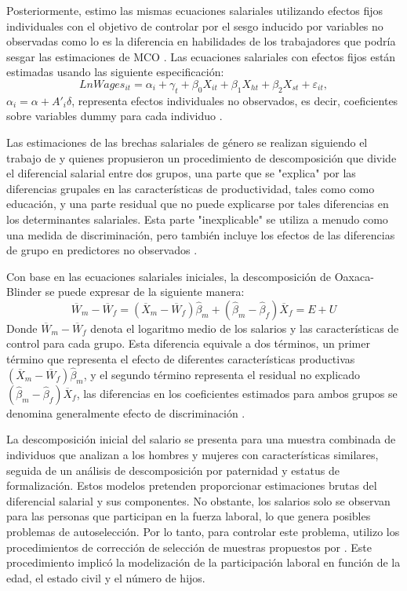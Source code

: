 Posteriormente, estimo las mismas ecuaciones salariales utilizando efectos fijos individuales con el objetivo de controlar por el sesgo inducido por variables no observadas como lo es la diferencia en habilidades de los trabajadores que podría sesgar las estimaciones de MCO \citep{Angrist2008}. Las ecuaciones salariales con efectos fijos están estimadas usando las siguiente especificación:
%
\begin{equation}
    LnWages_{it} = \alpha_{i} + \gamma_{t} + \beta_{0} X_{it} + \beta_{1} X_{ht} + \beta_{2} X_{st} + \varepsilon_{it}, 
\end{equation}
%
\noindent $\alpha_{i} = \alpha + A'_{i}\delta$, representa efectos individuales no observados, es decir, coeficientes sobre variables dummy para cada individuo \citep{Angrist2008}.

Las estimaciones de las brechas salariales de género se realizan siguiendo el trabajo de \citet{Blinder1973} y \citet{Oaxaca1973} quienes propusieron un procedimiento de descomposición que divide el diferencial salarial entre dos grupos, una parte que se "explica" por las diferencias grupales en las características de productividad, tales como como educación, y una parte residual que no puede explicarse por tales diferencias en los determinantes salariales. Esta parte "inexplicable" se utiliza a menudo como una medida de discriminación, pero también incluye los efectos de las diferencias de grupo en predictores no observados \citep{Jann2008}.

Con base en las ecuaciones salariales iniciales, la descomposición de Oaxaca-Blinder se puede expresar de la siguiente manera:
%
\begin{equation}
    \overline{W}_{m} - \overline{W}_{f} = (\overline{X}_{m} - \overline{W}_{f})\hat{\beta}_{m} + (\hat{\beta}_{m} - \hat{\beta}_{f})\overline{X}_{f} = E + U 
\end{equation}
%
\noindent Donde $\overline{W}_{m} - \overline{W}_{f}$ denota el logaritmo medio de los salarios y las características de control para cada grupo. Esta diferencia equivale a dos términos, un primer término que representa el efecto de diferentes características productivas $(\overline{X}_{m} - \overline{W}_{f})\hat{\beta}_{m}$, y el segundo término representa el residual no explicado $(\hat{\beta}_{m} - \hat{\beta}_{f})\overline{X}_{f}$, las diferencias en los coeficientes estimados para ambos grupos se denomina generalmente efecto de discriminación \citep{Weichselbaumer2005}.

La descomposición inicial del salario se presenta para una muestra combinada de individuos que analizan a los hombres y mujeres con características similares, seguida de un análisis de descomposición por paternidad y estatus de formalización. Estos modelos pretenden proporcionar estimaciones brutas del diferencial salarial y sus componentes. No obstante, los salarios solo se observan para las personas que participan en la fuerza laboral, lo que genera posibles problemas de autoselección. Por lo tanto, para controlar este problema, utilizo los procedimientos de corrección de selección de muestras propuestos por \citep{Heckman1979}. Este procedimiento implicó la modelización de la participación laboral en función de la edad, el estado civil y el número de hijos.

